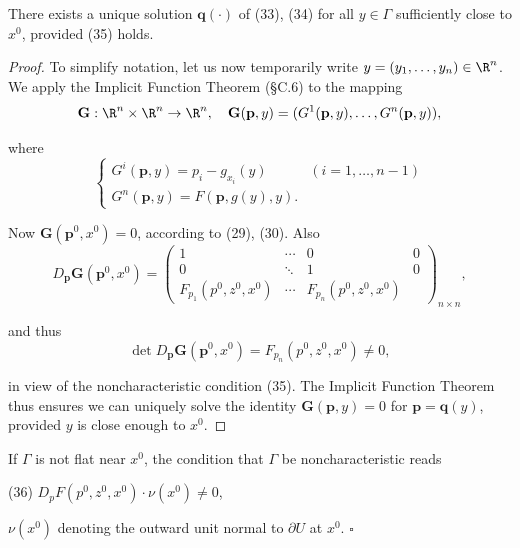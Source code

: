 \begin{lemma}
\label{lem:noncharacteristic-boundary-conditions}
There exists a unique solution $\mathbf{q}(\cdot)$ of (33), (34) for all $y \in \Gamma$ sufficiently close to $x^0$, provided (35) holds.
\end{lemma}

\begin{proof}
To simplify notation, let us now temporarily write $y = (y_1, \ldots, y_n) \in \R^n$. We apply the Implicit Function Theorem (\S C.6) to the mapping
$$\mathbf{G} : \R^n \times \R^n \to \R^n, \quad \mathbf{G}(\mathbf{p}, y) = (G^1(\mathbf{p}, y), \ldots, G^n(\mathbf{p}, y)),$$

where
$$\begin{cases}
G^i(\mathbf{p}, y) = p_i - g_{x_i}(y) & (i = 1, \ldots, n-1) \\
G^n(\mathbf{p}, y) = F(\mathbf{p}, g(y), y).
\end{cases}$$

Now $\mathbf{G}(\mathbf{p}^0, x^0) = 0$, according to (29), (30). Also
$$D_\mathbf{p} \mathbf{G}(\mathbf{p}^0, x^0) = \begin{pmatrix}
1 & \cdots & 0 & 0 \\
0 & \ddots & 1 & 0 \\
F_{p_1}(p^0, z^0, x^0) & \cdots & F_{p_n}(p^0, z^0, x^0)
\end{pmatrix}_{n \times n},$$

and thus
$$\det D_\mathbf{p} \mathbf{G}(\mathbf{p}^0, x^0) = F_{p_n}(p^0, z^0, x^0) \neq 0,$$

in view of the noncharacteristic condition (35). The Implicit Function Theorem thus ensures we can uniquely solve the identity $\mathbf{G}(\mathbf{p}, y) = 0$ for $\mathbf{p} = \mathbf{q}(y)$, provided $y$ is close enough to $x^0$.
\end{proof}

\begin{remark}
\label{rem:noncharacteristic-condition-general}
If $\Gamma$ is not flat near $x^0$, the condition that $\Gamma$ be noncharacteristic reads

(36) \qquad $D_p F(p^0, z^0, x^0) \cdot \nu(x^0) \neq 0$,

$\nu(x^0)$ denoting the outward unit normal to $\partial U$ at $x^0$. $\square$
\end{remark}

